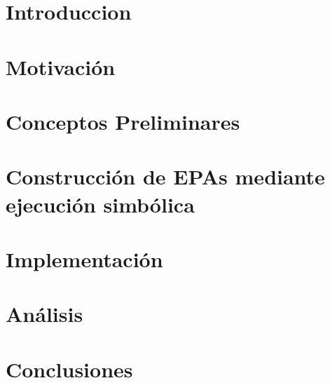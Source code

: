 \documentclass[11pt,a4paper,twoside]{tesis}
\theoremstyle{definition}
\begin{document}

\def\autor{Daniel Wappner}
\def\tituloTesis{Construcción de Enabledness Preserving Abstractions para smart contracts mediante ejecución simbólica}
\def\runtitulo{Construcción de Enabledness Preserving Abstractions para Smart Contracts mediante ejecución simbólica}
\def\runtitle{Construcción de Enabledness Preserving Abstractions para smart contracts mediante ejecución simbólica}
\def\codirector{Diego David Garbervetsky}
\def\director{Javier Godoy}
\def\lugar{Buenos Aires, 2024}


\frontmatter
\pagestyle{empty}





\cleardoublepage
\tableofcontents

\mainmatter
\pagestyle{headings}


\chapter{Introduccion}


\chapter{Motivación}

\chapter{Conceptos Preliminares}


\chapter{Construcción de EPAs mediante ejecución simbólica}


\chapter{Implementación}


\chapter{Análisis}


\chapter{Conclusiones}

\backmatter
\printbibliography
\end{document}
